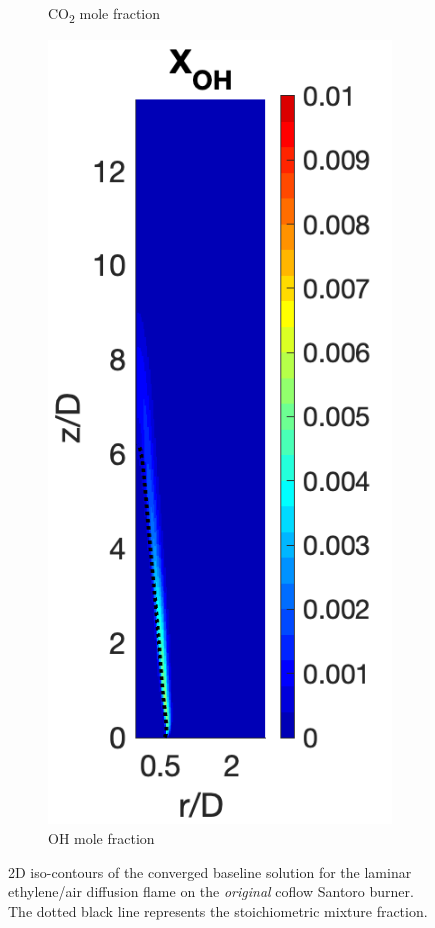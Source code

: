 \documentclass[12pt]{CHT-20}
\begin{document}
\begin{figure}[H]
\begin{subfigure}[b]{0.245\textwidth}
         \caption{CO\textsubscript{2} mole fraction}
     \end{subfigure}
     \begin{subfigure}[b]{0.215\textwidth}
         \centering
         \includegraphics[width=\textwidth]{figures/santoro/OHcontour.png}
         \caption{OH mole fraction}
     \end{subfigure}
        \caption{2D iso-contours of the converged baseline solution for the laminar ethylene/air diffusion flame on the \emph{original} coflow Santoro burner. The dotted black line represents the stoichiometric mixture fraction.}
        \label{fig:baselineContours}
\end{figure}
\end{document}

